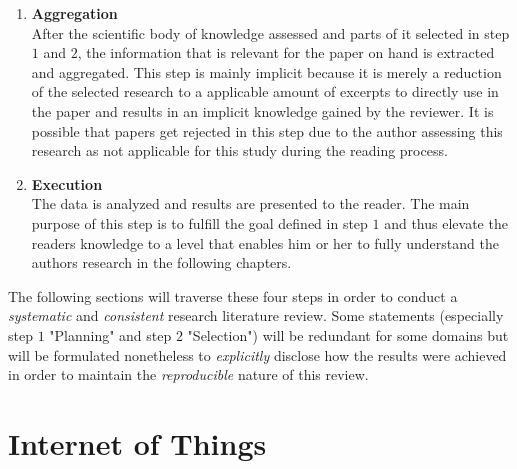 \begin{enumerate}
    \item
    \textbf{Aggregation}\\
    After the scientific body of knowledge assessed and parts of it selected in step $1$ and $2$, the information that is relevant for the paper on hand is extracted and aggregated. This step is mainly implicit because it is merely a reduction of the selected research to a applicable amount of excerpts to directly use in the paper and results in an implicit knowledge gained by the reviewer. It is possible that papers get rejected in this step due to the author assessing this research as not applicable for this study during the reading process.
    \item
    \textbf{Execution}\\
    The data is analyzed and results are presented to the reader. The main purpose of this step is to fulfill the goal defined in step $1$ and thus elevate the readers knowledge to a level that enables him or her to fully understand the authors research in the following chapters.
\end{enumerate}

The following sections will traverse these four steps in order to conduct a \textit{systematic} and \textit{consistent} research literature review. Some statements (especially step $1$ "Planning" and step $2$ "Selection") will be redundant for some domains but will be formulated nonetheless to \textit{explicitly} disclose how the results were achieved in order to maintain the \textit{reproducible} nature of this review.


\section{Internet of Things}

